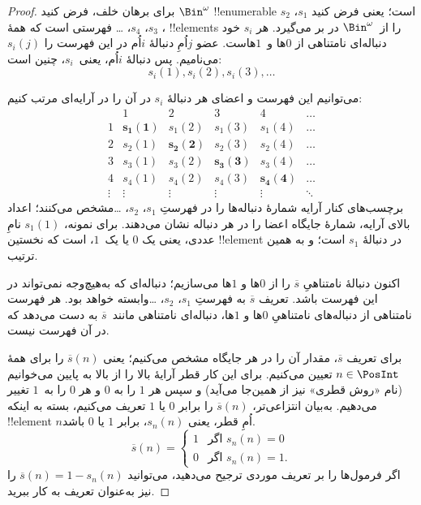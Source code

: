 \documentclass[../../../include/open-logic-section]{subfiles}
\begin{document}
\begin{proof}
برای برهان خلف، فرض کنید $\Bin^\omega$ !!{enumerable} است؛ یعنی فرض کنید
$s_{1}$، $s_{2}$، $s_{3}$، $s_{4}$، \dots{} فهرستی است که همهٔ
!!{element}s را از~$\Bin^\omega$ در بر می‌گیرد. هر $s_i$ خود دنباله‌ای
نامتناهی از $0$ها و~$1$هاست. عضو $j$اُمِ دنبالهٔ $i$اُم در این فهرست
را $s_i(j)$ می‌نامیم. پس دنبالهٔ $i$اُم، یعنی~$s_i$، چنین است:
\[
s_i(1), s_i(2), s_i(3), \dots
\]

می‌توانیم این فهرست و اعضای هر دنبالهٔ $s_i$ در آن را در آرایه‌ای
مرتب کنیم:
\[
\begin{array}{c|c|c|c|c|c}
& 1 & 2 & 3 & 4 & \dots \\\hline
1 & \mathbf{s_{1}(1)} & s_{1}(2) & s_{1}(3) & s_1(4) & \dots \\\hline
2 & s_{2}(1)& \mathbf{s_{2}(2)} & s_2(3) & s_2(4) & \dots \\\hline
3 & s_{3}(1)& s_{3}(2) & \mathbf{s_3(3)} & s_3(4) & \dots \\\hline
4 & s_{4}(1)& s_{4}(2) & s_4(3) & \mathbf{s_4(4)} & \dots \\\hline
\vdots & \vdots & \vdots & \vdots & \vdots & \mathbf{\ddots}
\end{array}
\]
برچسب‌های کنار آرایه شمارهٔ دنباله‌ها را در فهرستِ $s_1$، $s_2$،
\dots مشخص می‌کنند؛ اعداد بالای آرایه، شمارهٔ جایگاه اعضا را در هر
دنباله نشان می‌دهند. برای نمونه، $s_{1}(1)$ نامِ عددی،
یعنی یک $0$ یا یک~$1$، است که نخستین !!{element} در دنبالهٔ $s_{1}$
است؛ و به همین ترتیب.

اکنون دنبالهٔ نامتناهیِ $\overline{s}$ را از $0$ها و $1$ها می‌سازیم؛
دنباله‌ای که به‌هیچ‌وجه نمی‌تواند در این فهرست باشد. تعریف
$\overline{s}$ به فهرستِ $s_1$، $s_2$، \dots وابسته خواهد بود. هر
فهرست نامتناهی از دنباله‌های نامتناهیِ $0$ها و $1$ها، دنباله‌ای
نامتناهی مانند~$\overline{s}$ به دست می‌دهد که در آن فهرست نیست.

برای تعریف $\overline{s}$، مقدار آن را در هر جایگاه مشخص می‌کنیم؛
یعنی $\overline{s}(n)$ را برای همهٔ $n \in \PosInt$ تعیین می‌کنیم.
برای این کار قطر آرایهٔ بالا را از بالا به پایین می‌خوانیم (نام «روش
قطری» نیز از همین‌جا می‌آید) و سپس هر $1$ را به $0$ و هر $0$ را به~$1$
تغییر می‌دهیم. به‌بیان انتزاعی‌تر، $\overline{s}(n)$ را برابر $0$ یا
$1$ تعریف می‌کنیم، بسته به اینکه !!{element} $n$اُمِ قطر، یعنی
$s_n(n)$، برابر $1$ یا $0$ باشد.
\[
\overline{s}(n) =
\begin{cases}
1 & \text{اگر $s_{n}(n) = 0$}\\
0 & \text{اگر $s_{n}(n) = 1$}.
\end{cases}
\]
اگر فرمول‌ها را بر تعریف موردی ترجیح می‌دهید، می‌توانید
$\overline{s}(n) = 1 - s_n(n)$ را نیز به‌عنوان تعریف به کار ببرید.


\end{proof}
\end{document}
